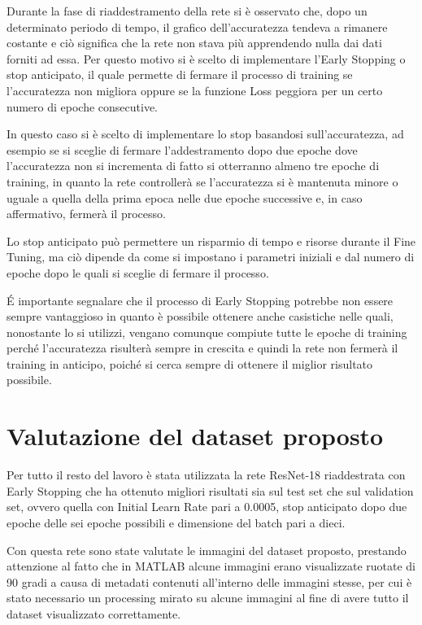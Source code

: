 Durante la fase di riaddestramento della rete si è osservato che, dopo un determinato periodo di tempo, il grafico dell'accuratezza tendeva a rimanere costante e ciò significa che la rete non stava più apprendendo nulla dai dati forniti ad essa. Per questo motivo si è scelto di implementare l'Early Stopping o stop anticipato, il quale permette di fermare il processo di training se l'accuratezza non migliora oppure se la funzione Loss peggiora per un certo numero di epoche consecutive. 

In questo caso si è scelto di implementare lo stop basandosi sull'accuratezza, ad esempio se si sceglie di fermare l'addestramento dopo due epoche dove l'accuratezza non si incrementa di fatto si otterranno almeno tre epoche di training, in quanto la rete controllerà se l'accuratezza si è mantenuta minore o uguale a quella della prima epoca nelle due epoche successive e, in caso affermativo, fermerà il processo.

Lo stop anticipato può permettere un risparmio di tempo e risorse durante il Fine Tuning, ma ciò dipende da come si impostano i parametri iniziali e dal numero di epoche dopo le quali si sceglie di fermare il processo. 

É importante segnalare che il processo di Early Stopping potrebbe non essere sempre vantaggioso in quanto è possibile ottenere anche casistiche nelle quali, nonostante lo si utilizzi, vengano comunque compiute tutte le epoche di training perché l'accuratezza risulterà sempre in crescita e quindi la rete non fermerà il training in anticipo, poiché si cerca sempre di ottenere il miglior risultato possibile.
 
 
\section{Valutazione del dataset proposto}
\label{valutazione}
Per tutto il resto del lavoro è stata utilizzata la rete ResNet-18 riaddestrata con Early Stopping che ha ottenuto migliori risultati sia sul test set che sul validation set, ovvero quella con Initial Learn Rate pari a 0.0005, stop anticipato dopo due epoche delle sei epoche possibili e dimensione del batch pari a dieci.

Con questa rete sono state valutate le immagini del dataset proposto, prestando attenzione al fatto che in MATLAB alcune immagini erano visualizzate ruotate di 90 gradi a causa di metadati contenuti all'interno delle immagini stesse, per cui è stato necessario un processing mirato su alcune immagini al fine di avere tutto il dataset visualizzato correttamente. 

